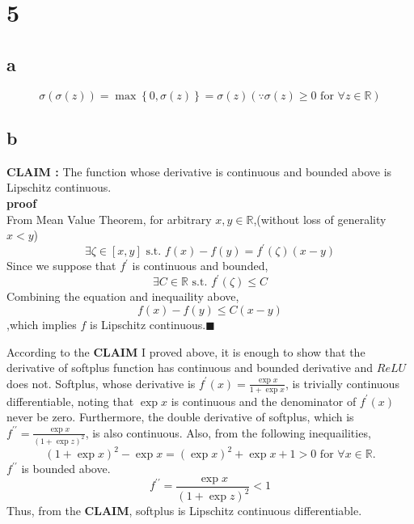 \documentclass[10pt]{article}
\begin{document}
\section*{5}
\subsection*{a}
\begin{equation}
    \sigma(\sigma(z)) = \max\left\{{0,\sigma(z)}\right\} = \sigma(z) (\because \sigma(z) \ge 0 \text{ for } \forall z \in \mathbb{R})
\end{equation}

\subsection*{b}
\textbf{CLAIM : } The function whose derivative is continuous and bounded above is Lipschitz continuous.\\
\textbf{proof}\\
From Mean Value Theorem, for arbitrary $x,y \in \mathbb{R}$,(without loss of generality $x < y$)
\begin{equation*}
    \exists \zeta \in \left[x,y\right] \text{ s.t. } f(x)-f(y) = f^\prime(\zeta)(x-y)
\end{equation*}
Since we suppose that $f^\prime$ is continuous and bounded, 
\begin{equation*}
    \exists C \in \mathbb{R} \text{ s.t. } f^\prime(\zeta) \le C
\end{equation*}
Combining the equation and inequaility above, 
\begin{equation*}
    f(x) - f(y) \le C(x - y)
\end{equation*}
,which implies $f$ is Lipschitz continuous.$\blacksquare$

According to the \textbf{CLAIM} I proved above, it is enough to show that the derivative of softplus function has continuous and bounded derivative and $ReLU$ does not. 
Softplus, whose derivative is $f^\prime(x) = \frac{\exp{x}}{1+\exp{x}}$, is trivially continuous differentiable, noting that $\exp{x}$ is continuous and the denominator of $f^\prime(x)$ never be zero. 
Furthermore, the double derivative of softplus, which is $f^{\prime \prime} = \frac{\exp{x}}{(1+\exp{z})^2}$, is also continuous. Also, from the following inequailities,
\begin{equation*}
    (1+\exp{x})^2 - \exp{x} = (\exp{x})^2 + \exp{x} + 1 > 0 \text{ for } \forall x \in \mathbb{R}.
\end{equation*}
$f^{\prime \prime}$ is bounded above.
\begin{equation*}
    f^{\prime \prime} = \frac{\exp{x}}{(1+\exp{z})^2} < 1
\end{equation*}
Thus, from the \textbf{CLAIM}, softplus is Lipschitz continuous differentiable.
\end{document}
